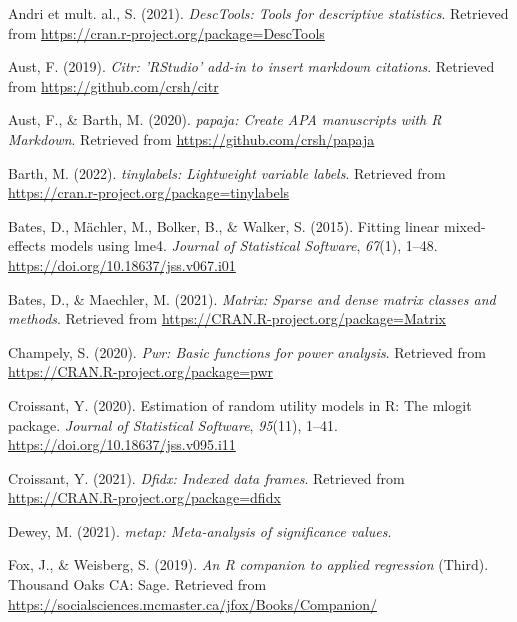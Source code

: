 \documentclass[
  man]{apa6}
\newlength{\cslhangindent}
\newlength{\cslentryspacingunit} %
\newenvironment{CSLReferences}[2] %
 {%
  \setlength{\parindent}{0pt}
  \ifodd #1
  \let\oldpar\par
  \def\par{\hangindent=\cslhangindent\oldpar}
  \fi
  \setlength{\parskip}{#2\cslentryspacingunit}
 }%
 {}
\begin{document}
\hypertarget{refs}{}
\begin{CSLReferences}{1}{0}
\leavevmode{}%
Andri et mult. al., S. (2021). \emph{{DescTools}: Tools for descriptive statistics}. Retrieved from \url{https://cran.r-project.org/package=DescTools}

\leavevmode{}%
Aust, F. (2019). \emph{Citr: 'RStudio' add-in to insert markdown citations}. Retrieved from \url{https://github.com/crsh/citr}

\leavevmode{}%
Aust, F., \& Barth, M. (2020). \emph{{papaja}: {Create} {APA} manuscripts with {R Markdown}}. Retrieved from \url{https://github.com/crsh/papaja}

\leavevmode{}%
Barth, M. (2022). \emph{{tinylabels}: Lightweight variable labels}. Retrieved from \url{https://cran.r-project.org/package=tinylabels}

\leavevmode{}%
Bates, D., Mächler, M., Bolker, B., \& Walker, S. (2015). Fitting linear mixed-effects models using {lme4}. \emph{Journal of Statistical Software}, \emph{67}(1), 1--48. \url{https://doi.org/10.18637/jss.v067.i01}

\leavevmode{}%
Bates, D., \& Maechler, M. (2021). \emph{Matrix: Sparse and dense matrix classes and methods}. Retrieved from \url{https://CRAN.R-project.org/package=Matrix}

\leavevmode{}%
Champely, S. (2020). \emph{Pwr: Basic functions for power analysis}. Retrieved from \url{https://CRAN.R-project.org/package=pwr}

\leavevmode{}%
Croissant, Y. (2020). Estimation of random utility models in {R}: The {mlogit} package. \emph{Journal of Statistical Software}, \emph{95}(11), 1--41. \url{https://doi.org/10.18637/jss.v095.i11}

\leavevmode{}%
Croissant, Y. (2021). \emph{Dfidx: Indexed data frames}. Retrieved from \url{https://CRAN.R-project.org/package=dfidx}

\leavevmode{}%
Dewey, M. (2021). \emph{{metap}: Meta-analysis of significance values}.

\leavevmode{}%
Fox, J., \& Weisberg, S. (2019). \emph{An {R} companion to applied regression} (Third). Thousand Oaks {CA}: Sage. Retrieved from \url{https://socialsciences.mcmaster.ca/jfox/Books/Companion/}


\end{CSLReferences}
\end{document}
